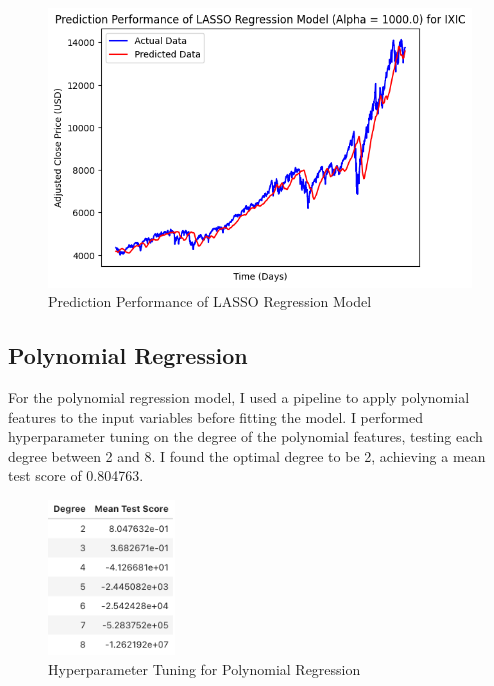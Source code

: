 \documentclass[a4paper, 11pt]{article}
\begin{document}
\begin{figure}[H]
    \begin{center}
        \includegraphics[width=1\textwidth]{Prediction Performance of LASSO Regression Model.png}
        \caption{Prediction Performance of LASSO Regression Model}
    \end{center}
\end{figure}

\subsection{Polynomial Regression}
For the polynomial regression model, I used a pipeline to apply polynomial features to the input variables before fitting the model. I performed hyperparameter tuning on the degree of the polynomial features, testing each degree between 2 and 8. I found the optimal degree to be 2, achieving a mean test score of 0.804763.

\begin{figure}[H]
    \begin{center}
        \includegraphics[width=0.3\textwidth]{Hyperparameter Tuning for Polynomial Regression.png}
        \caption{Hyperparameter Tuning for Polynomial Regression}
    \end{center}
\end{figure}
\end{document}
